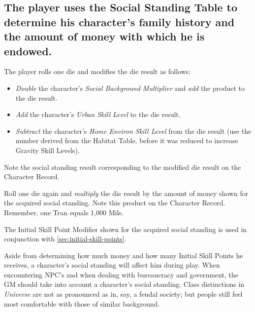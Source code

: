 \subsection[Social Standing Table]{The player uses the Social Standing
  Table to determine his 
  character's family history and the amount of money with which he is
  endowed.}
\label{sec:social-standing-table}

 

The player rolls one die and modifies the die result as follows:

\begin{itemize}
\item \emph{Double} the character's \emph{Social Background
    Multiplier} and \emph{add} the product to the die result.
\item \emph{Add} the character's \emph{Urban Skill Level} to the die
  result.
\item \emph{Subtract} the character's \emph{Home Environ Skill Level}
  from the die result (use the number derived from the Habitat Table,
  before it was  reduced to increase Gravity Skill Levels).
\end{itemize}

Note the social standing result corresponding to the modified die
result on the Character Record.

Roll one die again and \emph{multiply} the die result by the amount of
money shown for the acquired social standing. Note this product on the
Character Record. Remember, one Tran equals 1,000 Mils.

The Initial Skill Point Modifier shown for the acquired social
standing is used in conjunction with \ref{sec:initial-skill-points}.

Aside from 
determining how much money and how many Initial Skill Points he
receives, a character's social standing will affect him during play.
When encountering NPC's and when dealing with bureaucracy and
government, the GM should take into account a character's social
standing. Class distinctions in \emph{Universe} are not as pronounced
as in, say, a feudal society; but people still feel most comfortable
with those of similar background.


